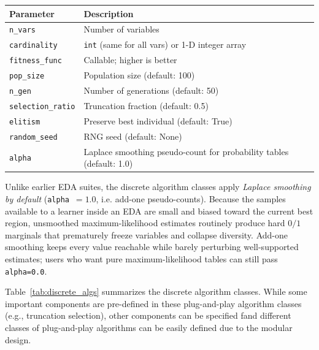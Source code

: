 \documentclass[a4paper,11pt]{article}
\begin{document}
\begin{center}
\begin{tabular}{lp{9cm}}
\toprule
Parameter & Description \\
\midrule
\texttt{n\_vars} & Number of variables \\
\texttt{cardinality} & \texttt{int} (same for all vars) or 1-D integer array \\
\texttt{fitness\_func} & Callable; higher is better \\
\texttt{pop\_size} & Population size (default: 100) \\
\texttt{n\_gen} & Number of generations (default: 50) \\
\texttt{selection\_ratio} & Truncation fraction (default: 0.5) \\
\texttt{elitism} & Preserve best individual (default: True) \\
\texttt{random\_seed} & RNG seed (default: None) \\
\texttt{alpha} & Laplace smoothing pseudo-count for probability tables (default: 1.0) \\
\bottomrule
\end{tabular}
\end{center}

\vspace{0.5em}

Unlike earlier EDA suites, the discrete algorithm classes apply
\emph{Laplace smoothing by default} (\texttt{alpha}~$=1.0$, i.e. add-one
pseudo-counts). Because the samples available to a learner inside an EDA are
small and biased toward the current best region, unsmoothed maximum-likelihood
estimates routinely produce hard $0/1$ marginals that prematurely freeze
variables and collapse diversity. Add-one smoothing keeps every value reachable
while barely perturbing well-supported estimates; users who want pure
maximum-likelihood tables can still pass \texttt{alpha=0.0}.

\vspace{0.5em}

Table~\ref{tab:discrete_algs} summarizes the discrete algorithm classes. While some important components are pre-defined in these plug-and-play algorithm classes (e.g., truncation selection), other components can be specified fand different classes of plug-and-play algorithms can be easily defined due to the modular design. 
\end{document}

